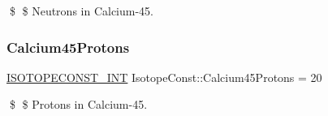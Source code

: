 \$ \$ Neutrons in Calcium-\/45. \mbox{\label{group___isotope_const-_calcium-_ca45_gad3ae7c88911c96f409d44221e9f108fa}} 
\subsubsection{\texorpdfstring{Calcium45\+Protons}{Calcium45Protons}}
{\footnotesize\ttfamily \mbox{\hyperlink{group___isotope_const-_macros_ga5f18360b3e99483a35c32d789e62621c}{I\+S\+O\+T\+O\+P\+E\+C\+O\+N\+S\+T\+\_\+\+I\+NT}} Isotope\+Const\+::\+Calcium45\+Protons = 20}

\$ \$ Protons in Calcium-\/45. 